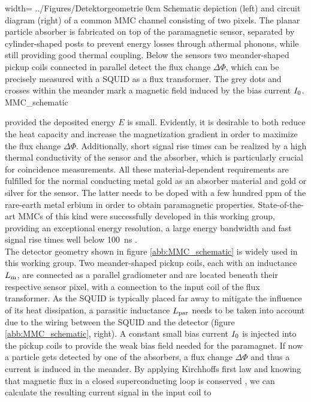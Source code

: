 
{width=\textwidth}
{../Figures/Detektorgeometrie}
{0cm}
{Schematic depiction (left) and circuit diagram (right) of a common MMC channel consisting of two pixels. The planar particle absorber is fabricated on top of the paramagnetic sensor, separated by cylinder-shaped posts to prevent energy losses through athermal phonons, while still providing good thermal coupling. Below the sensors two meander-shaped pickup coils connected in parallel detect the flux change $\Delta\Phi$, which can be precisely measured with a SQUID as a flux transformer. The grey dots and crosses within the meander mark a magnetic field induced by the bias current $I_{\rm 0}$.} 
{MMC_schematic}

provided the deposited energy $E$ is small. Evidently, it is desirable to both reduce the heat capacity and increase the magnetization gradient in order to maximize the flux change $\Delta\Phi$. Additionally, short signal rise times can be realized by a high thermal conductivity of the sensor and the absorber, which is particularly crucial for coincidence measurements. All these material-dependent requirements are fulfilled for the normal conducting metal gold as an absorber material and gold or silver for the sensor. The latter needs to be doped with a few hundred ppm of the rare-earth metal erbium in order to obtain paramagnetic properties. State-of-the-art MMCs of this kind were successfully developed in this working group, providing an exceptional energy resolution, a large energy bandwidth and fast signal rise times well below \qty{100}{\nano\s} \cite{Kempf2018}. \\

The detector geometry shown in figure \ref{abb:MMC_schematic} is widely used in this working group. Two meander-shaped pickup coils, each with an inductance $L_{\rm m}$, are connected as a parallel gradiometer and are located beneath their respective sensor pixel, with a connection to the input coil of the flux transformer. As the SQUID is typically placed far away to mitigate the influence of its heat dissipation, a parasitic inductance $L_{\rm par}$ needs to be taken into account due to the wiring between the SQUID and the detector (figure \ref{abb:MMC_schematic}, right). A constant small bias current $I_{\rm 0}$ is injected into the pickup coils to provide the weak bias field needed for the paramagnet. If now a particle gets detected by one of the absorbers, a flux change $\Delta\Phi$ and thus a current is induced in the meander. By applying Kirchhoffs first law and knowing that magnetic flux in a closed superconducting loop is conserved \cite{Landau1960}, we can calculate the resulting current signal in the input coil to \cite{Burck2004}

